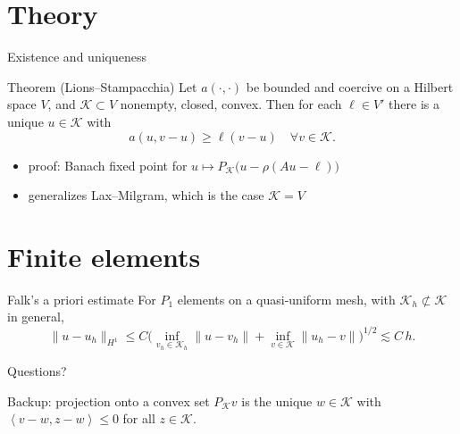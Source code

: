 \documentclass[aspectratio=169,11pt]{beamer}
\newcommand{\cK}{{\mathcal{K}}}  %
\newcommand{\ip}[2]{\left\langle #1, #2 \right\rangle}
\begin{document}
\section{Theory}

\begin{frame}{Existence and uniqueness}
  \begin{block}{Theorem (Lions--Stampacchia)}
    Let $a(\cdot,\cdot)$ be bounded and coercive on a Hilbert space $V$, and
    $\cK\subset V$ nonempty, closed, convex. Then for each $\ell\in V'$ there is a
    unique $u\in\cK$ with
    \[ a(u,v-u)\ge \ell(v-u) \quad\forall v\in\cK. \]
  \end{block}
  \pause
  \begin{itemize}
    \item proof: Banach fixed point for $u\mapsto P_\cK\big(u-\rho(Au-\ell)\big)$
    \item generalizes Lax--Milgram, which is the case $\cK=V$
  \end{itemize}
\end{frame}

\section{Finite elements}

\begin{frame}{Falk's a priori estimate}
  For $P_1$ elements on a quasi-uniform mesh, with $\cK_h\not\subset\cK$ in general,
  \[
    \|u-u_h\|_{H^1} \le C\Big(
      \inf_{v_h\in\cK_h}\|u-v_h\| + \inf_{v\in\cK}\|u_h - v\| \Big)^{1/2}
      \lesssim C\,h .
  \]
\end{frame}

\begin{frame}[standout]
  Questions?
\end{frame}

\appendix

\begin{frame}{Backup: projection onto a convex set}
  $P_\cK v$ is the unique $w\in\cK$ with $\ip{v-w}{z-w}\le 0$ for all $z\in\cK$.
\end{frame}
\end{document}
